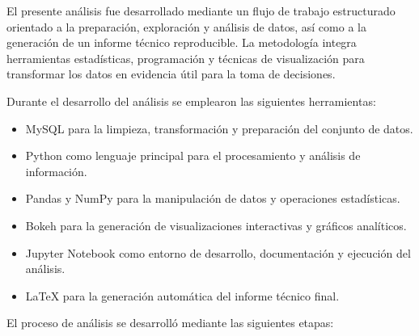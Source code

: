 
El presente análisis fue desarrollado mediante un flujo de trabajo estructurado orientado a la preparación, exploración y análisis de datos, así como a la generación de un informe técnico reproducible. La metodología integra herramientas estadísticas, programación y técnicas de visualización para transformar los datos en evidencia útil para la toma de decisiones.




Durante el desarrollo del análisis se emplearon las siguientes herramientas:

\begin{itemize}

\item MySQL para la limpieza, transformación y preparación del conjunto de datos.

\item Python como lenguaje principal para el procesamiento y análisis de información.

\item Pandas y NumPy para la manipulación de datos y operaciones estadísticas.

\item Bokeh para la generación de visualizaciones interactivas y gráficos analíticos.

\item Jupyter Notebook como entorno de desarrollo, documentación y ejecución del análisis.

\item \LaTeX{} para la generación automática del informe técnico final.

\end{itemize}




El proceso de análisis se desarrolló mediante las siguientes etapas:


